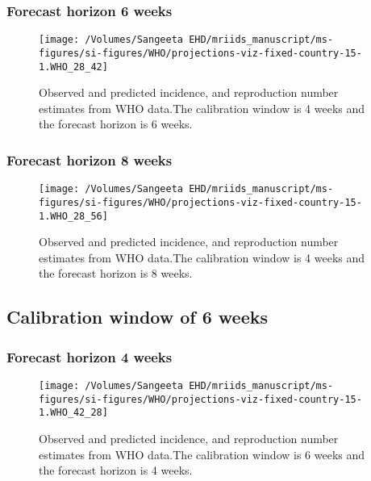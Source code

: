 \documentclass[9pt,twoside,lineno]{pnas-new}
\begin{document}
\hypertarget{forecast-horizon-6-weeks-7}{%
  \subsubsection{Forecast horizon 6 weeks}\label{forecast-horizon-6-weeks-7}}

\begin{figure}

  {
    \centering \texttt{[image: /Volumes/Sangeeta EHD/mriids\_manuscript/ms-figures/si-figures/WHO/projections-viz-fixed-country-15-1.WHO\_28\_42]} 

  }

  \caption{Observed and predicted incidence, and
    reproduction number estimates from WHO data.The calibration window
    is 4 weeks and the forecast horizon is 6 weeks.}
  \label{fig:who46}
\end{figure}

\hypertarget{forecast-horizon-8-weeks-7}{%
  \subsubsection{Forecast horizon 8 weeks}\label{forecast-horizon-8-weeks-7}}

\begin{figure}

  {\centering \texttt{[image: /Volumes/Sangeeta EHD/mriids\_manuscript/ms-figures/si-figures/WHO/projections-viz-fixed-country-15-1.WHO\_28\_56]} 

  }

  \caption{Observed and predicted incidence, and reproduction number estimates from WHO data.The calibration window is 4 weeks and the forecast horizon is 8 weeks.}\label{fig:SI-27}
\end{figure}

\hypertarget{calibration-window-of-6-weeks-2}{%
  \subsection{Calibration window of 6
    weeks}\label{calibration-window-of-6-weeks-2}}

\hypertarget{forecast-horizon-4-weeks-7}{%
  \subsubsection{Forecast horizon 4
    weeks}\label{forecast-horizon-4-weeks-7}}

\begin{figure}

  {\centering \texttt{[image: /Volumes/Sangeeta EHD/mriids\_manuscript/ms-figures/si-figures/WHO/projections-viz-fixed-country-15-1.WHO\_42\_28]} 

  }

  \caption{Observed and predicted incidence, and reproduction number estimates from WHO data.The calibration window is 6 weeks and the forecast horizon is 4 weeks.}\label{fig:SI-28}
\end{figure}
\end{document}
